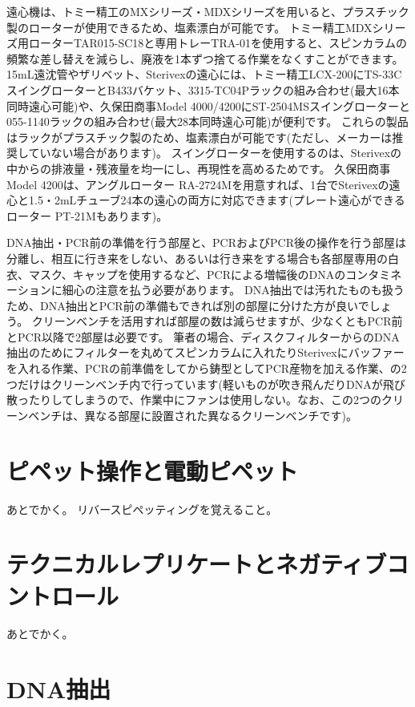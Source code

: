 \documentclass[titlepage,10pt,a4paper,uplatex]{jsbook}
\begin{document}
遠心機は、トミー精工のMXシリーズ・MDXシリーズを用いると、プラスチック製のローターが使用できるため、塩素漂白が可能です。
トミー精工MDXシリーズ用ローターTAR015-SC18と専用トレーTRA-01を使用すると、スピンカラムの頻繁な差し替えを減らし、廃液を1本ずつ捨てる作業をなくすことができます。
15mL遠沈管やザリベット、Sterivexの遠心には、トミー精工LCX-200にTS-33CスイングローターとB433バケット、3315-TC04Pラックの組み合わせ(最大16本同時遠心可能)や、久保田商事Model 4000/4200にST-2504MSスイングローターと055-1140ラックの組み合わせ(最大28本同時遠心可能)が便利です。
これらの製品はラックがプラスチック製のため、塩素漂白が可能です(ただし、メーカーは推奨していない場合があります)。
スイングローターを使用するのは、Sterivexの中からの排液量・残液量を均一にし、再現性を高めるためです。
久保田商事Model 4200は、アングルローター RA-2724Mを用意すれば、1台でSterivexの遠心と1.5・2mLチューブ24本の遠心の両方に対応できます(プレート遠心ができるローター PT-21Mもあります)。

DNA抽出・PCR前の準備を行う部屋と、PCRおよびPCR後の操作を行う部屋は分離し、相互に行き来をしない、あるいは行き来をする場合も各部屋専用の白衣、マスク、キャップを使用するなど、PCRによる増幅後のDNAのコンタミネーションに細心の注意を払う必要があります。
DNA抽出では汚れたものも扱うため、DNA抽出とPCR前の準備もできれば別の部屋に分けた方が良いでしょう。
クリーンベンチを活用すれば部屋の数は減らせますが、少なくともPCR前とPCR以降で2部屋は必要です。
筆者の場合、ディスクフィルターからのDNA抽出のためにフィルターを丸めてスピンカラムに入れたりSterivexにバッファーを入れる作業、PCRの前準備をしてから鋳型としてPCR産物を加える作業、の2つだけはクリーンベンチ内で行っています(軽いものが吹き飛んだりDNAが飛び散ったりしてしまうので、作業中にファンは使用しない。なお、この2つのクリーンベンチは、異なる部屋に設置された異なるクリーンベンチです)。

\section{ピペット操作と電動ピペット}

あとでかく。
リバースピペッティングを覚えること。

\section{テクニカルレプリケートとネガティブコントロール}

あとでかく。

\section{DNA抽出}
\end{document}
